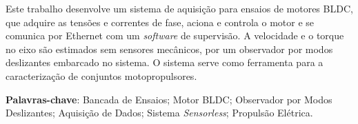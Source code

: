 
\setlength{\absparsep}{18pt} %
\begin{resumo}
Este trabalho desenvolve um sistema de aquisição para ensaios de motores BLDC, que adquire as tensões e correntes de fase, aciona e controla o motor e se comunica por Ethernet com um \textit{software} de supervisão. A velocidade e o torque no eixo são estimados sem sensores mecânicos, por um observador por modos deslizantes embarcado no sistema. O sistema serve como ferramenta para a caracterização de conjuntos motopropulsores.

 \textbf{Palavras-chave}: Bancada de Ensaios; Motor BLDC; Observador por Modos Deslizantes; Aquisição de Dados; Sistema \textit{Sensorless}; Propulsão Elétrica.
\end{resumo}
